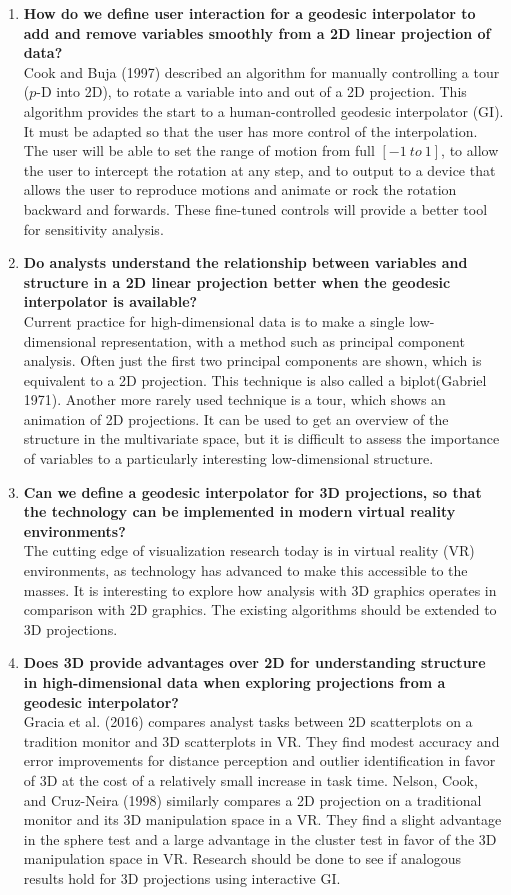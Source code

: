 \documentclass[
  11,
]{article}
\begin{document}
\begin{enumerate}
\def\labelenumi{\arabic{enumi}.}
\item
  \textbf{How do we define user interaction for a geodesic interpolator to add and remove variables smoothly from a 2D linear projection of data?}\\
  Cook and Buja (1997) described an algorithm for manually controlling a tour (\(p\)-D into 2D), to rotate a variable into and out of a 2D projection. This algorithm provides the start to a human-controlled geodesic interpolator (GI). It must be adapted so that the user has more control of the interpolation. The user will be able to set the range of motion from full \([-1~to~1]\), to allow the user to intercept the rotation at any step, and to output to a device that allows the user to reproduce motions and animate or rock the rotation backward and forwards. These fine-tuned controls will provide a better tool for sensitivity analysis.
\item
  \textbf{Do analysts understand the relationship between variables and structure in a 2D linear projection better when the geodesic interpolator is available?}\\
  Current practice for high-dimensional data is to make a single low-dimensional representation, with a method such as principal component analysis. Often just the first two principal components are shown, which is equivalent to a 2D projection. This technique is also called a biplot(Gabriel 1971). Another more rarely used technique is a tour, which shows an animation of 2D projections. It can be used to get an overview of the structure in the multivariate space, but it is difficult to assess the importance of variables to a particularly interesting low-dimensional structure.
\item
  \textbf{Can we define a geodesic interpolator for 3D projections, so that the technology can be implemented in modern virtual reality environments?}\\
  The cutting edge of visualization research today is in virtual reality (VR) environments, as technology has advanced to make this accessible to the masses. It is interesting to explore how analysis with 3D graphics operates in comparison with 2D graphics. The existing algorithms should be extended to 3D projections.
\item
  \textbf{Does 3D provide advantages over 2D for understanding structure in high-dimensional data when exploring projections from a geodesic interpolator?}\\
  Gracia et al. (2016) compares analyst tasks between 2D scatterplots on a tradition monitor and 3D scatterplots in VR. They find modest accuracy and error improvements for distance perception and outlier identification in favor of 3D at the cost of a relatively small increase in task time. Nelson, Cook, and Cruz-Neira (1998) similarly compares a 2D projection on a traditional monitor and its 3D manipulation space in a VR. They find a slight advantage in the sphere test and a large advantage in the cluster test in favor of the 3D manipulation space in VR. Research should be done to see if analogous results hold for 3D projections using interactive GI.
\end{enumerate}
\end{document}

